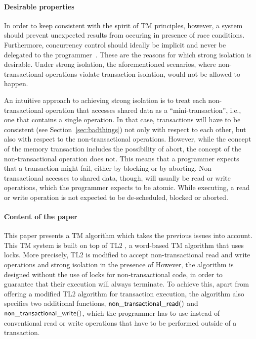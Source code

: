 \documentclass[11pt,letterpaper]{article}
\begin{document}
\paragraph{Desirable properties}
In order  to keep consistent with  the spirit of TM  principles, however, a
system should prevent unexpected   results  from   occuring  
in presence of  race conditions. 
Furthermore, concurrency   control should  ideally be implicit  
and never be delegated to  the programmer~\cite{CIR12,MS12}.  These are the  
reasons for  which strong isolation  is desirable. Under  strong isolation,
the aforementioned scenarios,   where non-transactional operations  violate
transaction isolation, would not be allowed to happen.  

An  intuitive approach  to  achieving  strong isolation  is  to treat  each
non-transactional operation that 
accesses shared data  as a ``mini-transaction'', i.e., one  that contains a
single operation. In that case,  transactions  will have to  be  
consistent (see Section~\ref{sec:badthings})  not only with 
respect to each other, but 
also with respect to the  non-transactional operations. However, while the
concept of the memory  transaction includes the possibility of abort,
the concept of the non-transactional operation does not.  This means that a
programmer expects  that a transaction  
might fail,  either by blocking or by  aborting. Non-transactional accesses
to shared data, though,  
will usually be  read or write operations, which  the programmer expects to
be  atomic. While executing, a  read  or write  operation   is  not 
expected  to  be de-scheduled, blocked or aborted.  



\paragraph{Content of the paper}
This paper presents  a TM  algorithm which takes the
previous issues into account. This TM system is built on top of 
TL2 \cite{dice06},  a  word-based  TM algorithm  that  uses locks. 
More precisely,  TL2 is modified to accept non-transactional read 
and write operations and strong isolation in the presence of  However,  
the algorithm  is designed  without the use  of locks  for non-transactional
code, in order to guarantee that their execution will always terminate.  
To achieve  this,  apart from  offering  a modified  TL2
algorithm for transaction execution,  
the     algorithm    also     specifies     two    additional     functions,
${\sf non\_transactional\_read()}$ and ${\sf non\_transactional\_write()}$,  
which  the programmer  has to  use instead  of conventional  read  or write
operations that have to be performed  outside  of  a  transaction.  
\end{document}
